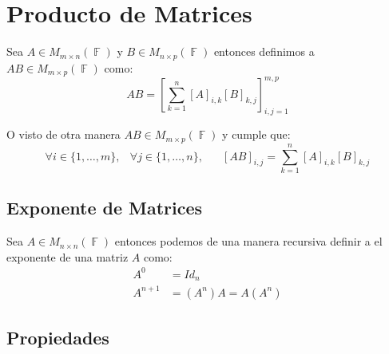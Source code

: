 \documentclass[12pt, fleqn]{report}                             %
\DeclareMathOperator \Space {\quad}                             %
\DeclareMathOperator \MiniSpace {\;}                            %
\theoremstyle{break}                                            %
\DeclareMathOperator \GenericField {\mathbb{F}}                 %
\newcommand{\Brackets}[1]    {\left[ #1 \right]}                %
\begin{document}
        \clearpage
        \section{Producto de Matrices}

            Sea $A \in M_{m \times n}(\GenericField)$ y $B \in M_{n \times p}(\GenericField)$
            entonces definimos a $AB \in M_{m \times p}(\GenericField)$ como:
            \begin{equation*}
                AB = \Brackets{ \sum_{k = 1}^n [A]_{i, k} [B]_{k, j} }_{i, j = 1}^{m, p}
            \end{equation*}

            O visto de otra manera $AB \in M_{m \times p}(\GenericField)$ y cumple que:
            \begin{equation*}
                \forall i \in \{1, \dots, m\} ,\MiniSpace
                    \forall j \in \{1, \dots, n\} ,\Space
                        [AB]_{i, j} = \sum_{k = 1}^n [A]_{i, k} [B]_{k, j}
            \end{equation*}


            \vspace{1em}
            \subsection{Exponente de Matrices}

                Sea $A \in M_{n \times n}(\GenericField)$ entonces podemos de una manera recursiva definir a
                el exponente de una matriz $A$ como:
                \begin{align*}
                    A^0       &= Id_n                        \\
                    A^{n + 1} &= (A^n) A = A (A^n)      
                \end{align*}


            \clearpage
            \subsection{Propiedades}
\end{document}
